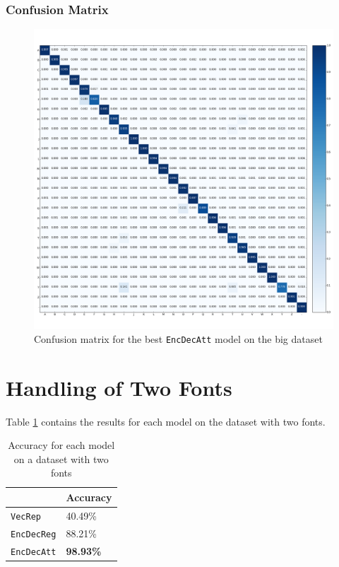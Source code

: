 \newpage
\subsubsection{Confusion Matrix}
\begin{figure}[H]
    \centering
    \includegraphics[width=1\textwidth]{fig/results/experiment1/big/encdecatt/confusion_matrix.png}
    \caption{Confusion matrix for the best {\tt EncDecAtt} model on the big dataset}
    \label{fig:result1_big_encdecatt_confusion_matrix}
\end{figure}


\section{Handling of Two Fonts}
Table \ref{table:accuracy_two_fonts} contains the results for each model on the dataset with two fonts.

\begin{table}[H]
    \centering
    \begin{tabular}{|l|l|}
        \hline 
                                        & \textbf{Accuracy}         \\ \hline
        {\tt VecRep }                   & 40.49\%                   \\ \hline
        {\tt EncDecReg}                 & 88.21\%                   \\ \hline
        {\tt EncDecAtt}                 & \textbf{98.93\%}          \\ \hline
    \end{tabular}
    \caption{Accuracy for each model on a dataset with two fonts}
    \label{table:accuracy_two_fonts}
\end{table}

